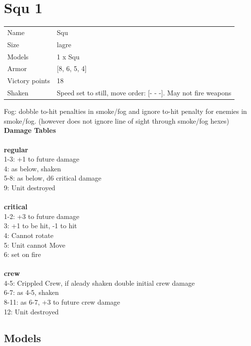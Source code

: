 \clearpage

\section{ Squ 1 }

\begin{tabular}{ll}
  Name & Squ \\
  Size & lagre\\
  Models & 1 x Squ\\
  Armor & [8, 6, 5, 4]\\
  Victory points & 18\\
  Shaken & Speed set to still, move order: [- - -]. May not fire weapons\\
\end{tabular}

Fog: dobble to-hit penalties in smoke/fog and ignore to-hit penalty for enemies in smoke/fog. (however does not ignore line of sight through smoke/fog hexes)\\ 



{\bf Damage Tables} \\
\ \\ {\bf regular } \\
1-3: +1 to future damage \\
4: as below, shaken \\
5-8: as below, d6 critical damage \\
9: Unit destroyed \\
\ \\ {\bf critical } \\
1-2: +3 to future damage \\
3: +1 to be hit, -1 to hit \\
4: Cannot rotate \\
5: Unit cannot Move  \\
6: set on fire \\
\ \\ {\bf crew } \\
4-5: Crippled Crew, if aleady shaken double initial crew damage \\
6-7: as 4-5, shaken \\
8-11: as 6-7, +3 to future crew damage \\
12: Unit destroyed \\


\clearpage

\subsection{ Models }

